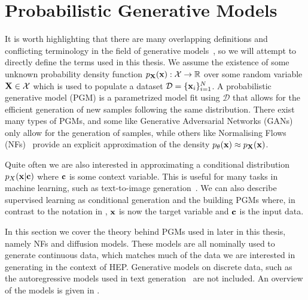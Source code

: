 \chapter{Probabilistic Generative Models}

It is worth highlighting that there are many overlapping definitions and conflicting terminology in the field of generative models~\cite{DiscriminativeVsGenerative, MachineLearningDiscriminative}, so we will attempt to directly define the terms used in this thesis.
We assume the existence of some unknown probability density function $p_{\mathbf{X}}(\mathbf{x}): \mathcal{X} \rightarrow \mathbb{R}$ over some random variable $\mathbf{X} \in \mathcal{X}$ which is used to populate a dataset $\mathcal{D} = \{\mathbf{x}_i\}_{i=1}^N$.
A probabilistic generative model (PGM) is a parametrized model fit using $\mathcal{D}$ that allows for the efficient generation of new samples following the same distribution.
There exist many types of PGMs, and some like Generative Adversarial Networks (GANs)~\cite{GenerativeAdversarialNetworks} only allow for the generation of samples, while others like Normalising Flows (NFs)~\cite{VariationalInferenceNormalizing} provide an explicit approximation of the density $p_{\theta}(\mathbf{x}) \approx p_{\mathbf{X}}(\mathbf{x})$.

Quite often we are also interested in approximating a conditional distribution $p_{X}(\mathbf{x}|\mathbf{c})$ where $\mathbf{c}$ is some context variable.
This is useful for many tasks in machine learning, such as text-to-image generation~\cite{Dalle}.
We can also describe supervised learning as conditional generation and the building PGMs where, in contrast to the notation in , $\mathbf{x}$ is now the target variable and $\mathbf{c}$ is the input data.

In this section we cover the theory behind PGMs used in later in this thesis, namely NFs and diffusion models.
These models are all nominally used to generate continuous data, which matches much of the data we are interested in generating in the context of HEP.
Generative models on discrete data, such as the autoregressive models used in text generation~\cite{GPT2} are not included.
An overview of the models is given in .

